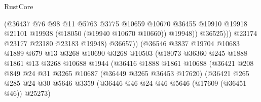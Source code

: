\begin{lexlean}{RustCore}
\begin{coremodule}
                                        (@36437
                                          @76
                                          @98
                                          @11
                                          @5763
                                          @3775
                                          @10659
                                          @10670
                                          @36455
                                          @19910
                                          @19918
                                          @21101
                                          @19938
                                          (@18050 (@19940 @10670 @10660))
                                          @19948))
                                      @36525)))
                                @23174
                                @23177
                                @23180
                                @23183
                                @19948)
                              @36657))
                          (@36546
                            @3837
                            @19704
                            @10683
                            @1889
                            @679
                            @13
                            @3268
                            @10690
                            @3268
                            @10503
                            (@18073
                              @36360
                              @245
                              @1888
                              @1861
                              @13
                              @3268
                              @10688
                              @1944
                              (@36416
                                @1888
                                @1861
                                @10688
                                (@36421
                                  @208
                                  @849
                                  @24
                                  @31
                                  @3265
                                  @10687
                                  (@36449 @3265 @36453 @17620)
                                  (@36421
                                    @265
                                    @285
                                    @24
                                    @30
                                    @5646
                                    @3359
                                    (@36446 @46 @24 @46 @5646 (@17609 (@36451 @46)) @25273)

\end{coremodule}
\end{lexlean}
